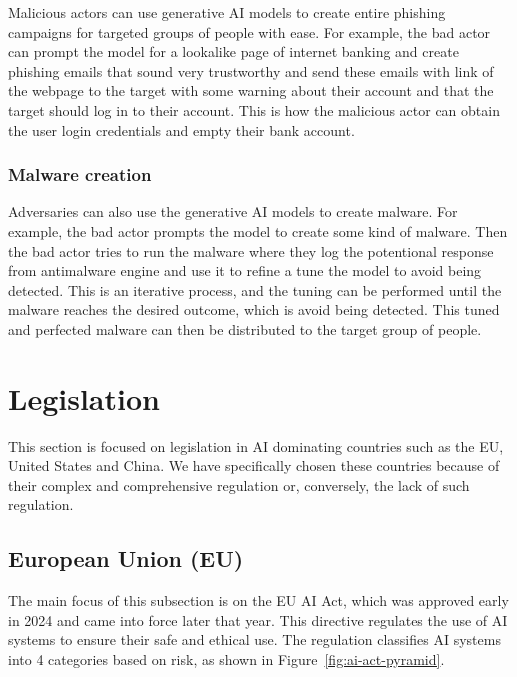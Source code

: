 Malicious actors can use generative AI models to create entire phishing campaigns for targeted groups of people with ease. For example, the bad actor can prompt the model for a lookalike page of internet banking and create phishing emails that sound very trustworthy and send these emails with link of the webpage to the target with some warning about their account and that the target should log in to their account. This is how the malicious actor can obtain the user login credentials and empty their bank account.

\subsubsection*{Malware creation}

Adversaries can also use the generative AI models to create malware. For example, the bad actor prompts the model to create some kind of malware. Then the bad actor tries to run the malware where they log the potentional response from antimalware engine and use it to refine a tune the model to avoid being detected. This is an iterative process, and the tuning can be performed until the malware reaches the desired outcome, which is avoid being detected. This tuned and perfected malware can then be distributed to the target group of people.


\section{Legislation} \label{sec:legislation}

This section is focused on legislation in AI dominating countries such as the EU, United States and China. We have specifically chosen these countries because of their complex and comprehensive regulation or, conversely, the lack of such regulation.

\subsection{European Union (EU)}
The main focus of this subsection is on the EU AI Act\cite{eu_ai_act_2024}, which was approved early in 2024 and came into force later that year. This directive regulates the use of AI systems to ensure their safe and ethical use. The regulation classifies AI systems into 4 categories based on risk, as shown in Figure~\ref{fig:ai-act-pyramid}.

